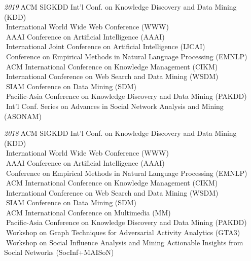 \documentclass[10pt]{article}
\newenvironment{myindentpar}[1]%
{\begin{list}{}%
         {\setlength{\leftmargin}{#1}}%
         \item[]%
}
{\end{list}}
\newcounter{list}
\begin{document}
\begin{myindentpar}{0.75cm}
{}


\hspace{-0.75cm}{\bf Program Committee}

{\small

\hspace{-0.75cm}\emph{2019}\textcolor{white}{.}ACM SIGKDD Int'l Conf. on Knowledge Discovery and Data Mining (KDD) \\
\textcolor{white}{.}International World Wide Web Conference (WWW) \\
\textcolor{white}{.}AAAI Conference on Artificial Intelligence (AAAI) \\
\textcolor{white}{.}International Joint Conference on Artificial Intelligence (IJCAI) \\
\textcolor{white}{.}Conference on Empirical Methods in Natural Language Processing (EMNLP) \\
\textcolor{white}{.}ACM International Conference on Knowledge Management (CIKM) \\
\textcolor{white}{.}International Conference on Web Search and Data Mining (WSDM) \\
\textcolor{white}{.}SIAM Conference on Data Mining (SDM) \\
\textcolor{white}{.}Pacific-Asia Conference on Knowledge Discovery and Data Mining (PAKDD) \\
\textcolor{white}{.}Int'l Conf. Series on Advances in Social Network Analysis and Mining (ASONAM)
	
\hspace{-0.75cm}\emph{2018}\textcolor{white}{.}ACM SIGKDD Int'l Conf. on Knowledge Discovery and Data Mining (KDD) \\
\textcolor{white}{.}International World Wide Web Conference (WWW) \\
\textcolor{white}{.}AAAI Conference on Artificial Intelligence (AAAI) \\
\textcolor{white}{.}Conference on Empirical Methods in Natural Language Processing (EMNLP) \\
\textcolor{white}{.}ACM International Conference on Knowledge Management (CIKM) \\
\textcolor{white}{.}International Conference on Web Search and Data Mining (WSDM) \\
\textcolor{white}{.}SIAM Conference on Data Mining (SDM) \\
\textcolor{white}{.}ACM International Conference on Multimedia (MM) \\
\textcolor{white}{.}Pacific-Asia Conference on Knowledge Discovery and Data Mining (PAKDD) \\
\textcolor{white}{.}Workshop on Graph Techniques for Adversarial Activity Analytics (GTA3) \\
\textcolor{white}{.}Workshop on Social Influence Analysis and Mining Actionable Insights from Social Networks (SocInf+MAISoN)

}
\end{myindentpar}
\end{document}
